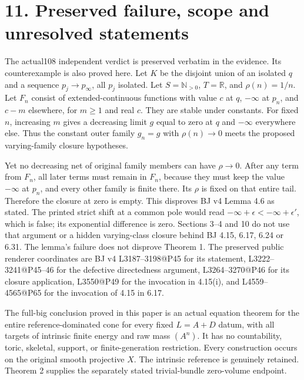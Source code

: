 \documentclass[
  10pt,
]{article}
\begin{document}
\section{11. Preserved failure, scope and unresolved
statements}\label{preserved-failure-scope-and-unresolved-statements}

The actual108 independent verdict is preserved verbatim in the evidence.
Its counterexample is also proved here. Let \(K\) be the disjoint union
of an isolated \(q\) and a sequence \(p_j\to p_\infty\), all \(p_j\)
isolated. Let \(S=\mathbb N_{>0}\), \(T=\mathbb R\), and
\(\rho(n)=1/n\). Let \(F_n\) consist of extended-continuous functions
with value \(c\) at \(q\), \(-\infty\) at \(p_n\), and \(c-m\)
elsewhere, for \(m\geq1\) and real \(c\). They are stable under
constants. For fixed \(n\), increasing \(m\) gives a decreasing limit
\(g\) equal to zero at \(q\) and \(-\infty\) everywhere else. Thus the
constant outer family \(g_n=g\) with \(\rho(n)\to0\) meets the proposed
varying-family closure hypotheses.

Yet no decreasing net of original family members can have \(\rho\to0\).
After any term from \(F_n\), all later terms must remain in \(F_n\),
because they must keep the value \(-\infty\) at \(p_n\), and every other
family is finite there. Its \(\rho\) is fixed on that entire tail.
Therefore the closure at zero is empty. This disproves BJ v4 Lemma 4.6
as stated. The printed strict shift at a common pole would read
\(-\infty+\epsilon<-\infty+\epsilon'\), which is false; its exponential
difference is zero. Sections 3--4 and 10 do not use that argument or a
hidden varying-class closure behind BJ 4.15, 6.17, 6.24 or 6.31. The
lemma's failure does not disprove Theorem 1. The preserved public
renderer coordinates are BJ v4 L3187--3198@P45 for its statement,
L3222--3241@P45--46 for the defective directedness argument,
L3264--3270@P46 for its closure application, L3550@P49 for the
invocation in 4.15(i), and L4559--4565@P65 for the invocation of 4.15 in
6.17.

The full-big conclusion proved in this paper is an actual equation
theorem for the entire reference-dominated cone for every fixed
\(L=A+D\) datum, with all targets of intrinsic finite energy and raw
mass \((A^n)\). It has no countability, toric, skeletal, support, or
finite-generation restriction. Every construction occurs on the original
smooth projective \(X\). The intrinsic reference is genuinely retained.
Theorem 2 supplies the separately stated trivial-bundle zero-volume
endpoint.
\end{document}
